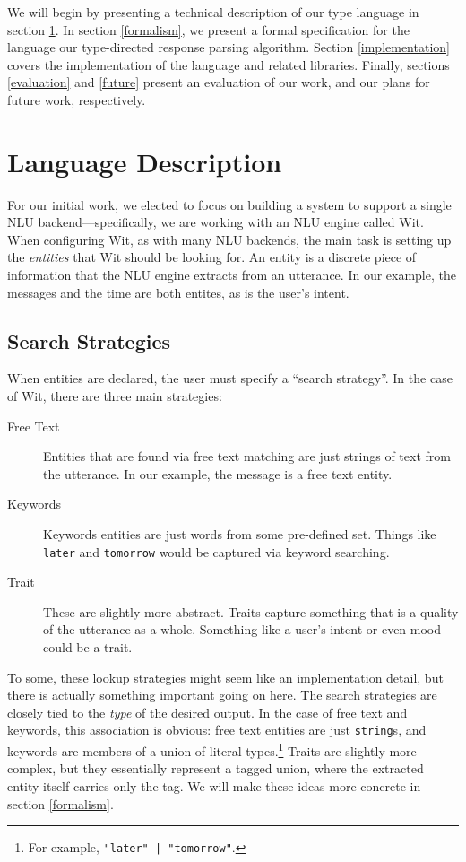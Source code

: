 \documentclass[twocolumn]{article}
\newcommand{\ts}[1]{\texttt{#1}}
\begin{document}
We will begin by presenting a technical description of our type language in
section \ref{description}. In section \ref{formalism}, we present a formal
specification for the language our type-directed response parsing algorithm.
Section \ref{implementation} covers the implementation of the language and
related libraries. Finally, sections \ref{evaluation} and \ref{future} present
an evaluation of our work, and our plans for future work, respectively.

\section{Language Description} \label{description}
For our initial work, we elected to focus on building a system to support a
single NLU backend---specifically, we are working with an NLU engine called
Wit.\fxnote{[CITE]} When configuring Wit, as with many NLU backends, the main
task is setting up the \emph{entities} that Wit should be looking for. An entity
is a discrete piece of information that the NLU engine extracts from an
utterance. In our example, the messages and the time are both entites, as is the
user's intent.

\subsection{Search Strategies}
When entities are declared, the user must specify a ``search strategy''. In the
case of Wit, there are three main strategies:
\begin{description}
\item[Free Text] Entities that are found via free text matching are just strings
of text from the utterance. In our example, the message is a free text entity.
\item[Keywords] Keywords entities are just words from some pre-defined set.
  Things like \ts{later} and
  \ts{tomorrow} would be captured via keyword searching.
\item[Trait] These are slightly more abstract. Traits capture something that is
  a quality of the utterance as a whole. Something like a user's intent or even
  mood could be a trait.
\end{description}

To some, these lookup strategies might seem like an implementation detail, but
there is actually something important going on here. The search strategies are
closely tied to the \emph{type} of the desired output. In the case of free text
and keywords, this association is obvious: free text entities are just
\ts{string}s, and keywords are members of a union of literal
types.\footnote{For example, \texttt{"later" | "tomorrow"}.} Traits are slightly
more complex, but they essentially represent a tagged union, where the extracted
entity itself carries only the tag. We will make these ideas more concrete in
section \ref{formalism}.
\end{document}
